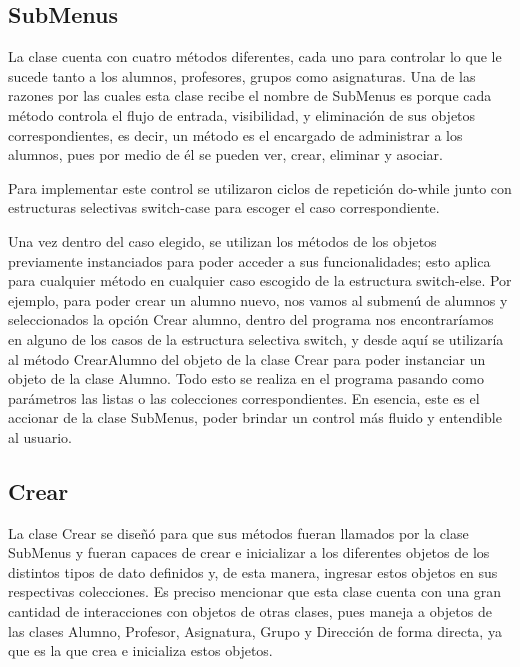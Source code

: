 \documentclass[11pt]{article}
\begin{document}
\subsection{SubMenus}
\par
La clase cuenta con cuatro métodos diferentes, cada uno para 
controlar lo que le sucede tanto a los alumnos, profesores, grupos 
como asignaturas. Una de las razones por las cuales esta clase recibe 
el nombre de SubMenus es porque cada método controla el flujo de 
entrada, visibilidad, y eliminación de sus objetos correspondientes, 
es decir, un método es el encargado de administrar a los alumnos, 
pues por medio de él se pueden ver, crear, eliminar y asociar.
 \par
Para implementar este control se utilizaron ciclos de repetición do-while 
junto con estructuras selectivas switch-case para escoger el caso 
correspondiente. 
\par
Una vez dentro del caso elegido, se utilizan los métodos de los objetos
previamente instanciados para poder acceder a sus funcionalidades;
 esto aplica para cualquier método en cualquier caso escogido de la estructura switch-else. 
Por ejemplo, para poder crear un alumno nuevo, nos vamos al submenú
 de alumnos y seleccionados la opción Crear alumno, dentro del programa nos 
encontraríamos en alguno de los casos de la estructura selectiva 
switch, y desde aquí se utilizaría al método CrearAlumno del objeto 
de la clase Crear para poder instanciar un objeto de la clase Alumno. 
Todo esto se realiza en el programa pasando como parámetros las 
listas o las colecciones correspondientes. En esencia, este es el 
accionar de la clase SubMenus, poder brindar un control más fluido y 
entendible al usuario.

\subsection{Crear}
\par
La clase Crear se diseñó para que sus métodos fueran llamados por la 
clase SubMenus y fueran capaces de crear e inicializar a los 
diferentes objetos de los distintos tipos de dato definidos y, de 
esta manera, ingresar estos objetos en sus respectivas colecciones. 
Es preciso mencionar que esta clase cuenta con una gran cantidad de 
interacciones con objetos de otras clases, pues maneja a objetos de 
las clases Alumno, Profesor, Asignatura, Grupo y Dirección de forma 
directa, ya que es la que crea e inicializa estos objetos. 

\par
\end{document}
